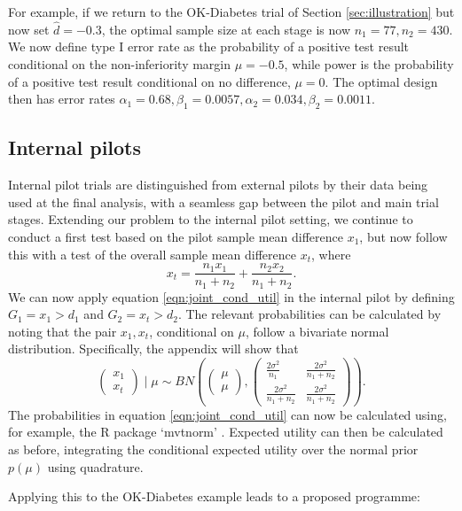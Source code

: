 \documentclass[sagev, Crown]{sagej}
\begin{document}
For example, if we return to the OK-Diabetes trial of Section \ref{sec:illustration} but now set $\hat{d} = -0.3$, the optimal sample size at each stage is now $n_1 = 77, n_2 = 430$. We now define type I error rate as the probability of a positive test result conditional on the non-inferiority margin $\mu = -0.5$, while power is the probability of a positive test result conditional on no difference, $\mu = 0$. The optimal design then has error rates $\alpha_1 = 0.68, \beta_1 = 0.0057, \alpha_2 = 0.034, \beta_2 = 0.0011$.


\subsection{Internal pilots}

Internal pilot trials are distinguished from external pilots by their data being used at the final analysis, with a seamless gap between the pilot and main trial stages. Extending our problem to the internal pilot setting, we continue to conduct a first test based on the pilot sample mean difference $x_1$, but now follow this with a test of the overall sample mean difference $x_t$, where
$$
x_t = \frac{n_1 x_1}{n_1 + n_2} + \frac{n_2 x_2}{n_1 + n_2}.
$$
We can now apply equation \ref{eqn:joint_cond_util} in the internal pilot by defining $G_1 = x_1 > d_1$ and $G_2 = x_t > d_2$. The relevant probabilities can be calculated by noting that the pair $x_1, x_t$, conditional on $\mu$, follow a bivariate normal distribution. Specifically, the appendix will show that
$$
\begin{pmatrix}
x_1 \\
x_t
\end{pmatrix} \mid \mu
\sim BN\left( 
\begin{pmatrix}
\mu \\
\mu
\end{pmatrix},
\begin{pmatrix}
\frac{2\sigma^2}{n_1} & \frac{2\sigma^2}{n_1 + n_2} \\
\frac{2\sigma^2}{n_1 + n_2} & \frac{2\sigma^2}{n_1 + n_2}
\end{pmatrix} \right).
$$
The probabilities in equation \ref{eqn:joint_cond_util} can now be calculated using, for example, the R package `mvtnorm' \cite{Genz2017}. Expected utility can then be calculated as before, integrating the conditional expected utility over the normal prior $p(\mu)$ using quadrature.

Applying this to the OK-Diabetes example leads to a proposed programme:
\end{document}
